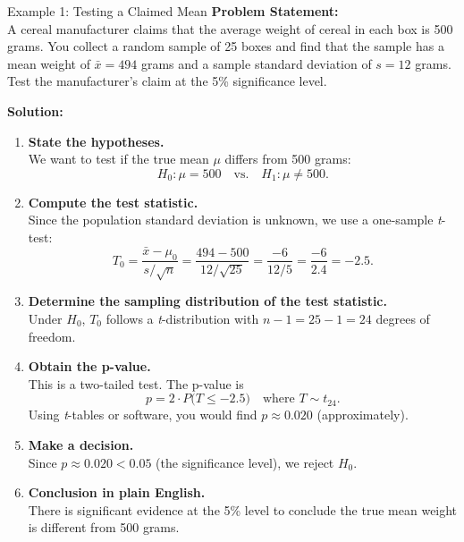 \documentclass[9pt]{extarticle}
\begin{document}
\begin{examplebox}{Example 1: Testing a Claimed Mean}{}
\scriptsize\textbf{Problem Statement:}\\
A cereal manufacturer claims that the average weight of cereal in each box is 500 grams. You collect a random sample of 25 boxes and find that the sample has a mean weight of $\bar{x} = 494$ grams and a sample standard deviation of $s = 12$ grams. Test the manufacturer's claim at the 5\% significance level.

\textbf{Solution:}\\
\begin{enumerate}
    \item \textbf{State the hypotheses.}\\
    We want to test if the true mean $\mu$ differs from 500 grams:
    \[
        H_0: \mu = 500 \quad\text{vs.}\quad H_1: \mu \neq 500.
    \]
    
    \item \textbf{Compute the test statistic.}\\
    Since the population standard deviation is unknown, we use a one-sample \emph{t}-test:
    \[
        T_0 = \frac{\bar{x} - \mu_0}{s / \sqrt{n}}
        = \frac{494 - 500}{12 / \sqrt{25}}
        = \frac{-6}{12 / 5}
        = \frac{-6}{2.4}
        = -2.5.
    \]
    
    \item \textbf{Determine the sampling distribution of the test statistic.}\\
    Under $H_0$, $T_0$ follows a \emph{t}-distribution with $n - 1 = 25 - 1 = 24$ degrees of freedom.
    
    \item \textbf{Obtain the p-value.}\\
    This is a two-tailed test. The p-value is
    \[
        p = 2 \cdot P\big(T \leq -2.5\big)\quad\text{where }T \sim t_{24}.
    \]
    Using \emph{t}-tables or software, you would find $p \approx 0.020$ (approximately).
    
    \item \textbf{Make a decision.}\\
    Since $p \approx 0.020 < 0.05$ (the significance level), we reject $H_0$.
    
    \item \textbf{Conclusion in plain English.}\\
    There is significant evidence at the 5\% level to conclude the true mean weight is different from 500 grams.
\end{enumerate}
\end{examplebox}
\end{document}
